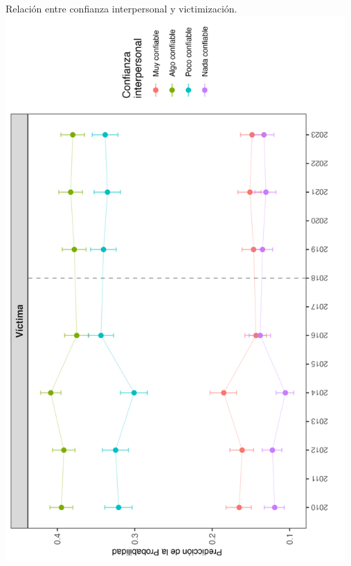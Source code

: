 \documentclass[letterpaper]{article}
\begin{document}
\begin{center}
Relación entre confianza interpersonal y victimización.
\includegraphics[width = 13cm]{plot_peer_02.png}
    \label{tab:plot5}
\end{center}

\newpage
\end{document}
